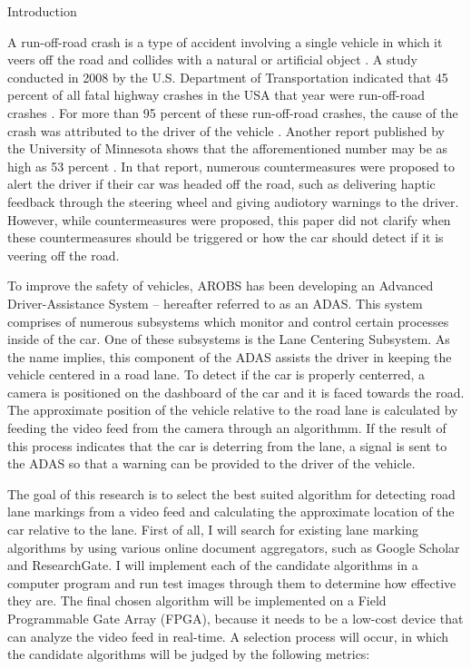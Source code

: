 \documentclass{matthijs}
\begin{document}
	\begin{hoofdstuk}{Introduction}

		A run-off-road crash is a type of accident involving a single vehicle in which it veers off the road and collides with a natural or artificial object \cite{liu2009factors}.
		A study conducted in 2008 by the U.S. Department of Transportation indicated that 45 percent of all fatal highway crashes in the USA that year were run-off-road crashes \cite{dod2011run}.
		For more than 95 percent of these run-off-road crashes, the cause of the crash was attributed to the driver of the vehicle \cite{dod2011run}.
		Another report published by the University of Minnesota shows that the afforementioned number may be as high as 53 percent \cite{edwards2013pilot}.
		In that report, numerous countermeasures were proposed to alert the driver if their car was headed off the road, such as delivering haptic feedback through the steering wheel and giving audiotory warnings to the driver.
		However, while countermeasures were proposed, this paper did not clarify when these countermeasures should be triggered or how the car should detect if it is veering off the road.
		
		\bigskip

		To improve the safety of vehicles, AROBS has been developing an Advanced Driver-Assistance System -- hereafter referred to as an ADAS.
		This system comprises of numerous subsystems which monitor and control certain processes inside of the car.
		One of these subsystems is the Lane Centering Subsystem.
		As the name implies, this component of the ADAS assists the driver in keeping the vehicle centered in a road lane.
		To detect if the car is properly centerred, a camera is positioned on the dashboard of the car and it is faced towards the road.
		The approximate position of the vehicle relative to the road lane is calculated by feeding the video feed from the camera through an algorithmm.
		If the result of this process indicates that the car is deterring from the lane, a signal is sent to the ADAS so that a warning can be provided to the driver of the vehicle.
		
		\bigskip

		The goal of this research is to select the best suited algorithm for detecting road lane markings from a video feed and calculating the approximate location of the car relative to the lane.
		First of all, I will search for existing lane marking algorithms by using various online document aggregators, such as Google Scholar and ResearchGate.
		I will implement each of the candidate algorithms in a computer program and run test images through them to determine how effective they are.
		The final chosen algorithm will be implemented on a Field Programmable Gate Array (FPGA), because it needs to be a low-cost device that can analyze the video feed in real-time.
		A selection process will occur, in which the candidate algorithms will be judged by the following metrics:


\end{hoofdstuk}
\end{document}
